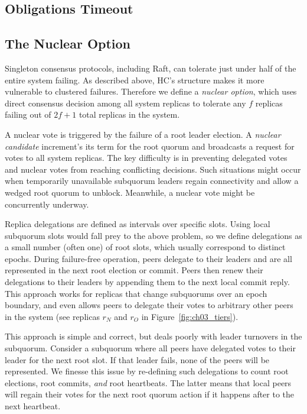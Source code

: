 \subsection{Obligations Timeout}
\label{ch03_obligations_timeout}


\subsection{The Nuclear Option}
\label{ch03_nuclear_option}


Singleton consensus protocols, including Raft, can tolerate just under half of the entire system failing.
As described above, HC's structure makes it more vulnerable to clustered failures.
Therefore we define a \emph{nuclear option}, which uses direct consensus decision among all system replicas to tolerate any $f$ replicas failing out of $2f+1$ total replicas in the system.

A nuclear vote is triggered by the failure of a root leader election.
A \emph{nuclear candidate} increment's its term for the root quorum and broadcasts a request for votes to all system replicas.
The key difficulty is in preventing delegated votes and nuclear votes from reaching conflicting decisions.
Such situations might occur when temporarily unavailable subquorum leaders regain connectivity and allow a wedged root quorum to unblock.
Meanwhile, a nuclear vote might be concurrently underway.

Replica delegations are defined as intervals over specific slots.
Using local subquorum slots would fall prey to the above problem, so we define delegations as a small number (often one) of root slots, which usually correspond to distinct epochs.
During failure-free operation, peers delegate to their leaders and are all represented in the next root election or commit.
Peers then renew their delegations to their leaders by appending them to the next local commit reply.
This approach works for replicas that change subquorums over an epoch boundary, and even allows peers to delegate their votes to arbitrary other peers in the system (see replicas $r_N$ and $r_O$ in Figure~\ref{fig:ch03_tiers}).

This approach is simple and correct, but deals poorly with leader turnovers in the subquorum.
Consider a subquorum where all peers have delegated votes to their leader for the next root slot.
If that leader fails, none of the peers will be represented.
We finesse this issue by re-defining such delegations to count root elections, root commits, \emph{and} root heartbeats.
The latter means that local peers will regain their votes for the next root quorum action if it happens after to the next heartbeat.

